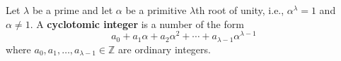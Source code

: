Let $\lambda$ be a prime and let $\alpha$ be a primitive $\lambda$th root of unity, i.e., $\alpha^\lambda = 1$ and $\alpha \neq 1$. A \textbf{cyclotomic integer} is a number of the form
$$a_0 + a_1\alpha + a_2\alpha^2 + \cdots + a_{\lambda-1}\alpha^{\lambda-1}$$
where $a_0, a_1, \ldots, a_{\lambda-1} \in \mathbb{Z}$ are ordinary integers.
